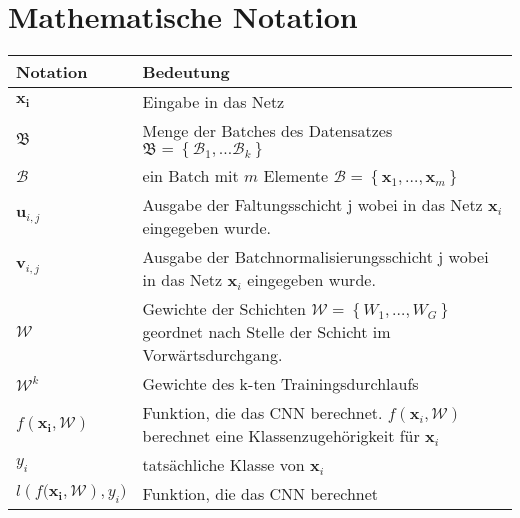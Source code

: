 
\chapter*{Mathematische Notation} \label{Notation}

\newcommand{\tabdummy}{\midrule[0pt]}

\begin{tabular}{p{}p{}}
  \textbf{Notation} & \textbf{Bedeutung} \\ \toprule[1pt]
   $\mathbf{x_{i}}$ & Eingabe in das Netz \\ \tabdummy
   $\mathfrak{B}$ & Menge der Batches des Datensatzes $\mathfrak{B}=\left\{ \mathcal{B}_{1} , \ldots \mathcal{B}_{k}   \right\} $\\ \tabdummy
   $\mathcal{B}$ & ein Batch mit $m$ Elemente $\mathcal{B}=\left\{ \mathbf{x}_1, \ldots, \mathbf{x}_m \right\} $\\ \tabdummy
   $\mathbf{u}_{i,j}$ & Ausgabe der Faltungsschicht j wobei in das Netz $\mathbf{x}_i$ eingegeben wurde.\\ \tabdummy
   $\mathbf{v}_{i,j}$ & Ausgabe der Batchnormalisierungsschicht j wobei in das Netz $\mathbf{x}_i$ eingegeben wurde.\\ \tabdummy
   $\mathcal{W}$ & Gewichte der Schichten $\mathcal{W}= \left\{ W_1, \ldots, W_G \right\} $ geordnet nach Stelle der Schicht im Vorwärtsdurchgang. \\ \tabdummy
   $\mathcal{W}^k$ & Gewichte des k-ten Trainingsdurchlaufs  \\ \tabdummy
   $f\left( \mathbf{x_i}, \mathcal{W}\right) $ & Funktion, die das CNN berechnet. $f\left( \mathbf{x}_i, \mathcal{W}\right)$ berechnet eine Klassenzugehörigkeit für $\mathbf{x}_i$ \\ \tabdummy
   $y_i$ & tatsächliche Klasse von $\mathbf{x}_i$ \\ \tabdummy     
   $l\left(f( \mathbf{x_i}, \mathcal{W}\right), y_i) $ & Funktion, die das CNN berechnet  
\end{tabular}
